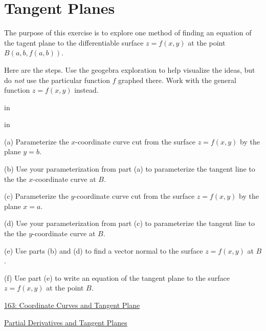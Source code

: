 \documentclass{ximera}
\newcommand{\pskip}{\vskip 0.1 in}
\begin{document}
\section{Tangent Planes}

\begin{exploration} \label{Edgcgtg}
The purpose of this exercise is to explore one method of finding an equation of the tagent plane to the differentiable surface $z=f(x,y)$ at the point $B(a,b,f(a,b))$.

Here are the steps. Use the geogebra exploration to help visualize the ideas, but do \emph{not} use the particular function $f$ graphed there. Work with the general function $z=f(x,y)$ instead.

\pskip

\pskip

(a) Parameterize the $x$-coordinate curve cut from the surface $z=f(x,y)$ by the plane $y=b$.

(b) Use your parameterization from part (a) to parameterize the tangent line to the the $x$-coordinate curve at $B$.

(c) Parameterize the $y$-coordinate curve cut from the surface $z=f(x,y)$ by the plane $x=a$.

(d) Use your parameterization from part (c) to parameterize the tangent line to the the $y$-coordinate curve at $B$.

(e) Use parts (b) and (d) to find a vector normal to the surface $z=f(x,y)$ at $B$.

(f) Use part (e) to write an equation of the tangent plane to the surface $z=f(x,y)$ at the point $B$.


\begin{onlineOnly}
    \begin{center}
\end{center}
\end{onlineOnly}


\href{https://www.geogebra.org/classic/fgdjhdjm}{163: Coordinate Curves and Tangent Plane}




\end{exploration}




\begin{exploration}  \label{Ede5fhj4665}
\href{https://www.geogebra.org/m/Hud6Hnpk}{Partial Derivatives and Tangent Planes}
\end{exploration}
\end{document}

